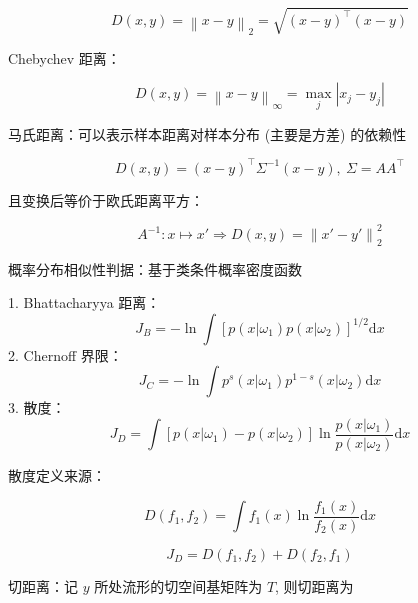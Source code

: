 \documentclass[openany,a4paper,12pt]{ctexbook}
\theoremstyle{kaiti}
\theoremstyle{normal}
\begin{document}
\begin{equation}
D\left(x,y \right)=\left\| x-y \right\|_2=\sqrt{\left(x-y \right)^{\top}\left(x-y \right)}
\end{equation}

Chebychev 距离：

\begin{equation}
D\left(x,y \right)=\left\| x-y \right\|_{\infty}=\max_j|x_j-y_j|
\end{equation}

马氏距离：可以表示样本距离对样本分布 (主要是方差) 的依赖性

\begin{equation}
D\left(x,y \right)=\left(x-y \right)^{\top}\Sigma ^{-1}\left(x-y \right),~\Sigma =AA^{\top}
\end{equation}

且变换后等价于欧氏距离平方：

\begin{equation}
A^{-1}:x\mapsto x'\Rightarrow D\left(x,y \right)=\left\| x'-y' \right\|_{2}^{2}
\end{equation}

概率分布相似性判据：基于类条件概率密度函数

1. Bhattacharyya 距离：
  \begin{equation}
  J_B=-\ln \int \left[p\left(x|\omega_1 \right)p\left(x|\omega_2 \right)\right] ^{1/2}\mathrm{d}x
  \end{equation}
2. Chernoff 界限：
  \begin{equation}
  J_C=-\ln \int p^s\left(x|\omega_1 \right)p^{1-s}\left(x|\omega_2 \right)\mathrm{d}x
  \end{equation}
3. 散度：
  \begin{equation}
  J_D=\int \left[p\left(x|\omega_1 \right)-p\left(x|\omega_2 \right)\right] \ln\frac{p\left(x|\omega_1 \right)}{p\left(x|\omega_2 \right)} \mathrm{d}x
  \end{equation}

散度定义来源：

\begin{equation}
D\left(f_1,f_2 \right)=\int f_1(x)\ln\frac{f_1(x)}{f_2(x)} \mathrm{d}x
\end{equation}

\begin{equation}
J_D=D\left(f_1,f_2 \right)+D\left(f_2,f_1 \right)
\end{equation}

切距离：记 $y$ 所处流形的切空间基矩阵为 $T$, 则切距离为
\end{document}
